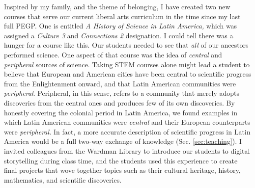 \documentclass[../../main.tex]{subfiles}
\begin{document}
Inspired by my family, and the theme of belonging, I have created two new courses that serve our current liberal arts curriculum in the time since my last full PEGP.  One is entitled \textit{A History of Science in Latin America,} which was assigned a \textit{Culture 3} and \textit{Connections 2} designation.  I could tell there was a hunger for a course like this.  Our students needed to see that \textit{all} of our ancestors performed science.  One aspect of that course was the idea of \textit{central} and \textit{peripheral} sources of science.  Taking STEM courses alone might lead a student to believe that European and American cities have been central to scientific progress from the Enlightenment onward, and that Latin American communities were \textit{peripheral}.  Peripheral, in this sense, refers to a community that merely adopts discoveries from the central ones and produces few of its own discoveries.  By honestly covering the colonial period in Latin America, we found examples in which Latin American communities were \textit{central} and their European counterparts were \textit{peripheral.}  In fact, a more accurate description of scientific progress in Latin America would be a full two-way exchange of knowledge (Sec. \ref{sec:teaching}).  I invited colleagues from the Wardman Library to introduce our students to digital storytelling during class time, and the students used this experience to create final projects that wove together topics such as their cultural heritage, history, mathematics, and scientific discoveries.
\\
\vspace{0.25cm}
\end{document}
